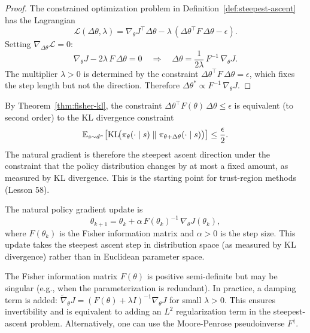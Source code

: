 \documentclass[11pt,a4paper]{article}
\begin{document}
\begin{proof}
The constrained optimization problem in
Definition~\ref{def:steepest-ascent} has the Lagrangian
\[
  \mathcal{L}(\Delta\theta, \lambda) = \nabla_\theta J^\top \Delta\theta
  - \lambda\, (\Delta\theta^\top F\, \Delta\theta - \epsilon).
\]
Setting $\nabla_{\Delta\theta} \mathcal{L} = 0$:
\[
  \nabla_\theta J - 2\lambda\, F\, \Delta\theta = 0
  \quad \Longrightarrow \quad
  \Delta\theta = \frac{1}{2\lambda}\, F^{-1}\, \nabla_\theta J.
\]
The multiplier $\lambda > 0$ is determined by the constraint
$\Delta\theta^\top F\, \Delta\theta = \epsilon$, which fixes the step
length but not the direction. Therefore
$\Delta\theta^* \propto F^{-1}\, \nabla_\theta J$.
\end{proof}

\begin{remark}
\label{rem:kl-trust-region}
By Theorem~\ref{thm:fisher-kl}, the constraint
$\Delta\theta^\top F(\theta)\, \Delta\theta \leq \epsilon$ is equivalent
(to second order) to the KL divergence constraint
\[
  \mathbb{E}_{s \sim d^\pi}\!\left[\operatorname{KL}\!\bigl(\pi_\theta(\cdot \mid s)
  \;\|\; \pi_{\theta+\Delta\theta}(\cdot \mid s)\bigr)\right]
  \leq \frac{\epsilon}{2}.
\]
The natural gradient is therefore the steepest ascent direction under
the constraint that the policy distribution changes by at most a fixed
amount, as measured by KL divergence. This is the starting point for
trust-region methods (Lesson 58).
\end{remark}

\begin{keyresult}[title={Natural Policy Gradient Update}]
The natural policy gradient update is
\[
  \theta_{k+1} = \theta_k + \alpha\, F(\theta_k)^{-1}\,
  \nabla_\theta J(\theta_k),
\]
where $F(\theta_k)$ is the Fisher information matrix and $\alpha > 0$
is the step size. This update takes the steepest ascent step in
distribution space (as measured by KL divergence) rather than in
Euclidean parameter space.
\end{keyresult}

\begin{warning}[title={Invertibility of the Fisher Matrix}]
The Fisher information matrix $F(\theta)$ is positive semi-definite but
may be singular (e.g., when the parameterization is redundant). In
practice, a damping term is added: $\tilde{\nabla}_\theta J =
(F(\theta) + \lambda I)^{-1} \nabla_\theta J$ for small $\lambda > 0$.
This ensures invertibility and is equivalent to adding an $L^2$
regularization term in the steepest-ascent problem. Alternatively, one
can use the Moore-Penrose pseudoinverse $F^\dagger$.
\end{warning}
\end{document}

